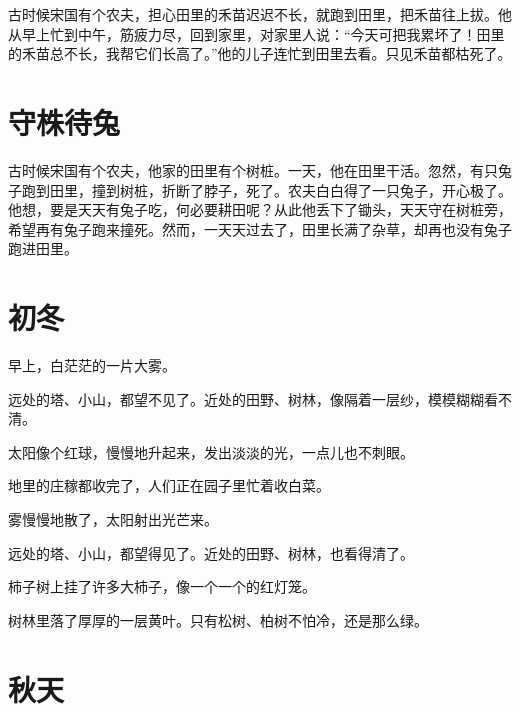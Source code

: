 \documentclass[12pt,UTF-8,openany]{ctexbook}
\begin{document}
\begin{large}
    
    古时候宋国有个农夫，担心田里的禾苗迟迟不长，就跑到田里，把禾苗往上拔。他从早上忙到中午，筋疲力尽，回到家里，对家里人说：“今天可把我累坏了！田里的禾苗总不长，我帮它们长高了。”他的儿子连忙到田里去看。只见禾苗都枯死了。
    
\end{large}



\chapter{守株待兔}

\begin{large}
    
    古时候宋国有个农夫，他家的田里有个树桩。一天，他在田里干活。忽然，有只兔子跑到田里，撞到树桩，折断了脖子，死了。农夫白白得了一只兔子，开心极了。他想，要是天天有兔子吃，何必要耕田呢？从此他丢下了锄头，天天守在树桩旁，希望再有兔子跑来撞死。然而，一天天过去了，田里长满了杂草，却再也没有兔子跑进田里。
    
\end{large}



\chapter{初冬}

\begin{large}
    
    早上，白茫茫的一片大雾。
    
    远处的塔、小山，都望不见了。近处的田野、树林，像隔着一层纱，模模糊糊看不清。
    
    太阳像个红球，慢慢地升起来，发出淡淡的光，一点儿也不刺眼。
    
    地里的庄稼都收完了，人们正在园子里忙着收白菜。
    
    雾慢慢地散了，太阳射出光芒来。
    
    远处的塔、小山，都望得见了。近处的田野、树林，也看得清了。
    
    柿子树上挂了许多大柿子，像一个一个的红灯笼。
    
    树林里落了厚厚的一层黄叶。只有松树、柏树不怕冷，还是那么绿。
    
\end{large}



\chapter{秋天}
\end{document}
